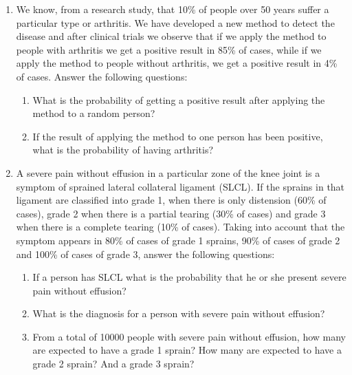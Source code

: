 \begin{enumerate}[leftmargin=*,resume]
\item We know, from a research study, that 10\% of people over 50 years suffer a particular type or arthritis.
We have developed a new method to detect the disease and after clinical trials we observe that if we apply the method to
people with arthritis we get a positive result in 85\% of cases, while if we apply the method to people without
arthritis, we get a positive result in 4\% of cases.
Answer the following questions:
\begin{enumerate}
\item What is the probability of getting a positive result after applying the method to a random person?
\item If the result of applying the method to one person has been positive, what is the probability of having arthritis?
\end{enumerate}

\item A severe pain without effusion in a particular zone of the knee joint is a symptom of sprained lateral collateral
ligament (SLCL). 
If the sprains in that ligament are classified into grade 1, when there is only distension (60\% of cases), grade 2 when
there is a partial tearing (30\% of cases) and grade 3 when there is a complete tearing (10\% of cases).
Taking into account that the symptom appears in 80\% of cases of grade 1 sprains, 90\% of cases of grade 2 and 100\% of
cases of grade 3, answer the following questions:

\begin{enumerate}
\item If a person has SLCL what is the probability that he or she present severe pain without effusion?
\item What is the diagnosis for a person with severe pain without effusion?
\item From a total of 10000 people with severe pain without effusion, how many are expected to have a grade 1 sprain? 
How many are expected to have a grade 2 sprain? And a grade 3 sprain?
\end{enumerate}


\end{enumerate}


